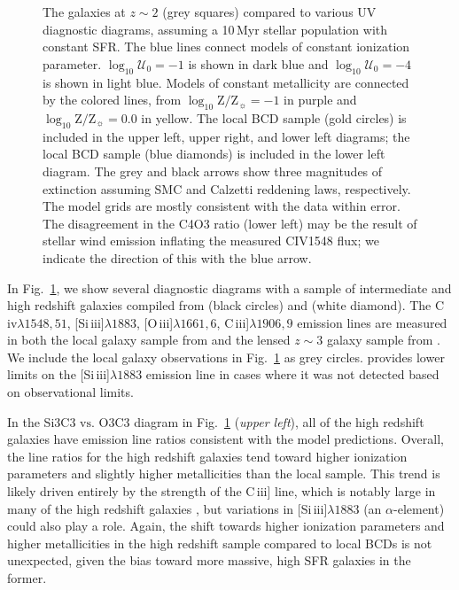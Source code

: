 \documentclass[preprint2,trackchanges]{aastex62}
\newcommand{\oiii}{[O\,{\sc iii}]\xspace}
\newcommand{\civ}{C\,{\sc iv}\xspace}
\newcommand{\SiuIII}{[Si\,{\sc iii}]\xspace}
\newcommand{\ciii}{C\,{\sc iii}]\xspace}
\newcommand\vs{\ensuremath{\mathrm{vs.}}\xspace}
\newcommand{\Myr}{$\,$Myr\xspace}
\newcommand{\logten}{\ensuremath{\log_{10}}}
\newcommand{\logZeq}[1]{\ensuremath{\logten \mathrm{Z}/\mathrm{Z}_{\sun} = #1}}
\newcommand{\logUeq}[1]{\ensuremath{\logten \mathcal{U}_0 = #1}}
\begin{document}
\begin{figure}
\begin{center}
    \caption{The \citet{Stark+2014} galaxies at $z{\sim}2$ (grey squares) compared to various UV diagnostic diagrams, assuming a 10\Myr stellar population with constant SFR. The blue lines connect models of constant ionization parameter. \logUeq{-1} is shown in dark blue and \logUeq{-4} is shown in light blue. Models of constant metallicity are connected by the colored lines, from \logZeq{-1} in purple and \logZeq{0.0} in yellow. The \citet{Berg+2016} local BCD sample (gold circles) is included in the upper left, upper right, and lower left diagrams; the \citet{Senchyna+2017} local BCD sample (blue diamonds) is included in the lower left diagram. The grey and black arrows show three magnitudes of extinction assuming SMC and Calzetti reddening laws, respectively. The model grids are mostly consistent with the \citet{Stark+2014} data within error. The disagreement in the C4O3 ratio (lower left) may be the result of stellar wind emission inflating the measured C\textsc{IV}1548 flux; we indicate the direction of this with the blue arrow.}
    \label{fig:dataHiZ}
  \end{center}
\end{figure}

In Fig.~\ref{fig:dataHiZ}, we show several diagnostic diagrams with a sample of intermediate and high redshift galaxies compiled from \citet{Stark+2014} (black circles) and \citet{Christensen+2012} (white diamond). The \civ$\lambda1548,51$, \SiuIII$\lambda1883$, \oiii$\lambda1661,6$, \ciii$\lambda1906,9$ emission lines are measured in both the local galaxy sample from \citet{Berg+2016} and the lensed $z{\sim}3$ galaxy sample from \citet{Stark+2014}. We include the local galaxy observations in Fig.~\ref{fig:dataHiZ} as grey circles. \citet{Stark+2015} provides lower limits on the \SiuIII$\lambda1883$ emission line in cases where it was not detected based on observational limits.

In the Si3C3 \vs O3C3 diagram in Fig.~\ref{fig:dataHiZ} (\emph{upper left}), all of the high redshift galaxies have emission line ratios consistent with the model predictions. Overall, the line ratios for the high redshift galaxies tend toward higher ionization parameters and slightly higher metallicities than the local sample. This trend is likely driven entirely by the strength of the \ciii line, which is notably large in many of the high redshift galaxies \citep{Stark+2014}, but variations in \SiuIII$\lambda1883$ (an $\alpha$-element) could also play a role. Again, the shift towards higher ionization parameters and higher metallicities in the high redshift sample compared to local BCDs is not unexpected, given the bias toward more massive, high SFR galaxies in the former.
\end{document}
